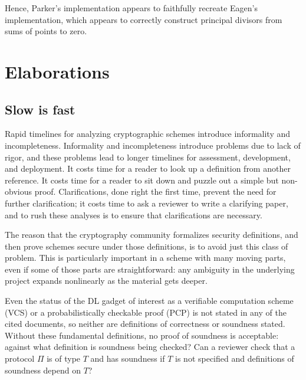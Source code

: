 \documentclass{article}
\theoremstyle{definition}
\newcommand{\6}{\mathbf}
\newcommand{\7}{\mathcal}
\begin{document}
Hence, Parker's implementation appears to faithfully recreate Eagen's implementation, which appears to correctly construct principal divisors from sums of points to zero.


\section{Elaborations}


\subsection{Slow is fast}

Rapid timelines for analyzing cryptographic schemes introduce informality and incompleteness. 
Informality and incompleteness introduce problems due to lack of rigor, and these problems lead to longer timelines for assessment, development, and deployment.
It costs time for a reader to look up a definition from another reference. 
It costs time for a reader to sit down and puzzle out a simple but non-obvious proof. 
Clarifications, done right the first time, prevent the need for further clarification; it costs time to ask a reviewer to write a clarifying paper, and to rush these analyses is to ensure that clarifications are necessary.


The reason that the cryptography community formalizes security definitions, and then prove schemes secure under those definitions, is to avoid just this class of problem. 
This is particularly important in a scheme with many moving parts, even if some of those parts are straightforward: any ambiguity in the underlying project expands nonlinearly as the material gets deeper.

Even the status of the DL gadget of interest as a verifiable computation scheme (VCS) or a probabilistically checkable proof (PCP) is not stated in any of the cited documents, so neither are definitions of correctness or soundness stated. 
Without these fundamental definitions, no proof of soundness is acceptable: against what definition is soundness being checked? Can a reviewer check that a protocol $\Pi$ is of type $T$ and has soundness if $T$ is not specified and definitions of soundness depend on $T$?
\end{document}
